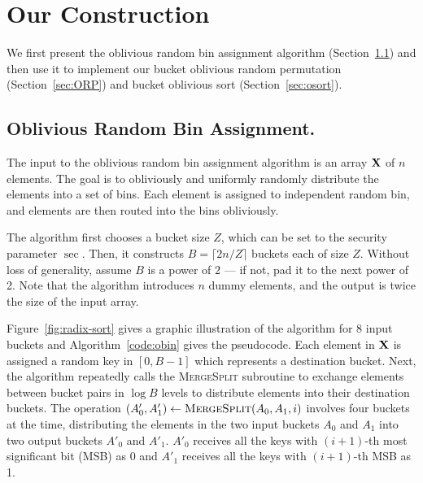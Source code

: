 



\section{Our Construction} 
\label{sec:construction}
\label{sec:random-bin-assignment}

We first present the oblivious random bin assignment algorithm (Section~\ref{sec:obin})  and then use it to implement our bucket oblivious random permutation (Section~\ref{sec:ORP}) and bucket oblivious sort (Section~\ref{sec:osort}).

\newcommand{\val}{{\sf value}}
\newcommand{\pref}{{\sf pref}}


\subsection{Oblivious Random Bin Assignment.}
\label{sec:obin}

The input to the oblivious random bin assignment algorithm is an array $\mathbf{X}$ of $n$ elements. 
The goal is to obliviously and uniformly randomly distribute the elements into a set of bins. Each element is assigned to independent random bin, and elements are then routed into the bins obliviously. 

The algorithm first chooses a bucket size $Z$, which can be set to the security parameter $\sec$. 
Then, it constructs $B=\lceil 2n/Z \rceil$ buckets each of size $Z$.
Without loss of generality, assume $B$ is a power of $2$ --- if not, pad it to the next power of 2. Note that the algorithm introduces $n$ dummy elements, and the output is twice the size of the input array. %


Figure~\ref{fig:radix-sort} gives a graphic illustration of the algorithm for 8 input buckets and Algorithm~\ref{code:obin} gives the pseudocode.
Each element in $\mathbf{X}$ is assigned a random key in $[0, B-1]$ which represents a destination bucket.
Next, the algorithm repeatedly calls the \textsc{MergeSplit} subroutine to exchange elements between bucket pairs in $\log B$ levels to distribute elements into their destination buckets. 
The operation $(A'_0,A'_1)\leftarrow \textsc{MergeSplit}(A_0,A_1,i)$ involves four buckets at the time, distributing the elements in the two input buckets $A_0$ and $A_1$ into two output buckets $A'_0$ and $A'_1$.
$A'_0$ receives all the keys with $(i+1)$-th most significant bit (MSB) as 0 and $A'_1$ receives all the keys with $(i+1)$-th MSB as 1.


